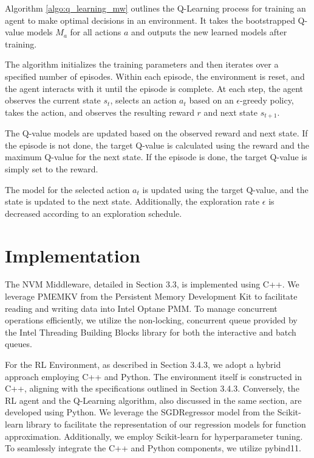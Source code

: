 Algorithm \ref{algo:q_learning_mw} outlines the Q-Learning process for training an agent to make optimal decisions in an environment. It takes the bootstrapped Q-value models $M_a$ for all actions $a$ and outputs the new learned models after training.

The algorithm initializes the training parameters and then iterates over a specified number of episodes. Within each episode, the environment is reset, and the agent interacts with it until the episode is complete. At each step, the agent observes the current state $s_t$, selects an action $a_t$ based on an $\epsilon$-greedy policy, takes the action, and observes the resulting reward $r$ and next state $s_{t+1}$.

The Q-value models are updated based on the observed reward and next state. If the episode is not done, the target Q-value is calculated using the reward and the maximum Q-value for the next state. If the episode is done, the target Q-value is simply set to the reward.

The model for the selected action $a_t$ is updated using the target Q-value, and the state is updated to the next state. Additionally, the exploration rate $\epsilon$ is decreased according to an exploration schedule.

\section{Implementation}

The NVM Middleware, detailed in Section 3.3, is implemented using C++. We leverage PMEMKV from the Persistent Memory Development Kit \cite{scargall2020pmem} to facilitate reading and writing data into Intel Optane PMM. To manage concurrent operations efficiently, we utilize the non-locking, concurrent queue provided by the Intel Threading Building Blocks \cite{tbb:online} library for both the interactive and batch queues.

For the RL Environment, as described in Section 3.4.3, we adopt a hybrid approach employing C++ and Python. The environment itself is constructed in C++, aligning with the specifications outlined in Section 3.4.3. Conversely, the RL agent and the Q-Learning algorithm, also discussed in the same section, are developed using Python. We leverage the SGDRegressor model from the Scikit-learn\cite{scikitle61:online} library to facilitate the representation of our regression models for function approximation. Additionally, we employ Scikit-learn for hyperparameter tuning. To seamlessly integrate the C++ and Python components, we utilize pybind11\cite{pybind1111:online}.